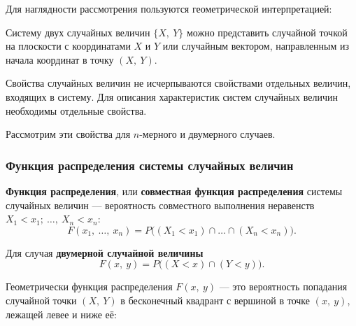 \documentclass[a4paper]{article}
\newcommand{\key}[1]{{\color{Medium}\bfseries #1}}
\begin{document}
                Для наглядности рассмотрения пользуются геометрической интерпретацией:
                
                Систему двух случайных величин $\{ X, \: Y \}$ можно представить случайной точкой на плоскости с координатами $X$ и $Y$ или случайным вектором, направленным из начала координат в точку $(X, \: Y)$.
                
                Свойства случайных величин не исчерпываются свойствами отдельных величин, входящих в систему. Для описания характеристик систем случайных величин необходимы отдельные свойства.
                
                Рассмотрим эти свойства для $n$-мерного и двумерного случаев.

            \subsubsection{Функция распределения системы случайных величин}

                \key{Функция распределения}, или \key{совместная функция распределения} системы случайных величин --- вероятность совместного выполнения неравенств $X_1 < x_1 ; \: \ldots , \: X_n < x_n$:
                \begin{equation*}
                    F(x_1 , \: \ldots , \: x_n) =
                        P \big( (X_1 < x_1) \cap \ldots \cap (X_n < x_n) \big) .
                \end{equation*}

                Для случая \key{двумерной случайной величины}
                \begin{equation*}
                    F(x, \: y) = P \big( (X < x) \cap (Y < y) \big) .
                \end{equation*}

                Геометрически функция распределения $F(x, \: y)$ --- это вероятность попадания случайной точки $(X, \: Y)$ в бесконечный квадрант с вершиной в точке $(x, \: y)$, лежащей левее и ниже её:
\end{document}

